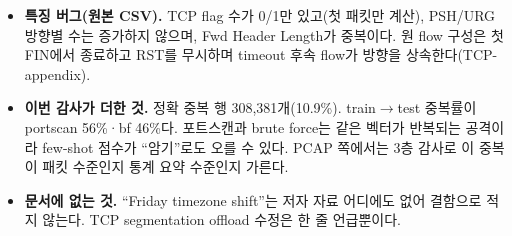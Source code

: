 \begin{itemize}
\item \textbf{특징 버그(원본 CSV).} TCP flag 수가 0/1만 있고(첫 패킷만 계산), PSH/URG 방향별 수는 증가하지 않으며, Fwd Header Length가 중복이다. 원 flow 구성은 첫 FIN에서 종료하고 RST를 무시하며 timeout 후속 flow가 방향을 상속한다(TCP-appendix).
\item \textbf{이번 감사가 더한 것.} 정확 중복 행 308,381개(10.9\%). train$\to$test 중복률이 portscan 56\%·bf 46\%다. 포트스캔과 brute force는 같은 벡터가 반복되는 공격이라 few-shot 점수가 ``암기''로도 오를 수 있다. PCAP 쪽에서는 3층 감사로 이 중복이 패킷 수준인지 통계 요약 수준인지 가른다.
\item \textbf{문서에 없는 것.} ``Friday timezone shift''는 저자 자료 어디에도 없어 결함으로 적지 않는다. TCP segmentation offload 수정은 한 줄 언급뿐이다.
\end{itemize}

